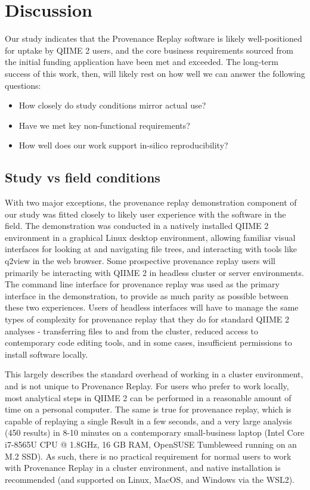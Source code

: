 \chapter{Discussion}

Our study indicates that the Provenance Replay software is likely
well-positioned for uptake by QIIME 2 users, and the core business requirements
sourced from the initial funding application have been met and exceeded. The
long-term success of this work, then, will likely rest on how well we can answer
the following questions:

\begin{itemize}
    \item How closely do study conditions mirror actual use?
    \item Have we met key non-functional requirements?
    \item How well does our work support in-silico reproducibility?
\end{itemize}

\section{Study vs field conditions}

With two major exceptions, the provenance replay demonstration component of our
study was fitted closely to likely user experience with the software in the
field. The demonstration was conducted in a natively installed QIIME 2
environment in a graphical Linux desktop environment, allowing familiar visual
interfaces for looking at and navigating file trees, and interacting with tools
like q2view in the web browser. Some prospective provenance replay users will
primarily be interacting with QIIME 2 in headless cluster or server
environments. The command line interface for provenance replay was used as the
primary interface in the demonstration, to provide as much parity as possible
between these two experiences. Users of headless interfaces will have to manage
the same types of complexity for provenance replay that they do for standard
QIIME 2 analyses - transferring files to and from the cluster, reduced access to
contemporary code editing tools, and in some cases, insufficient permissions to
install software locally. 

This largely describes the standard overhead of working in a cluster
environment, and is not unique to Provenance Replay. For users who prefer to
work locally, most analytical steps in QIIME 2 can be performed in a reasonable
amount of time on a personal computer. The same is true for provenance replay,
which is capable of replaying a single Result in a few seconds, and a very large
analysis (450 results) in 8-10 minutes on a contemporary small-business laptop
(Intel Core i7-8565U CPU @ 1.8GHz, 16 GB RAM, OpenSUSE Tumbleweed running on an
M.2 SSD). As such, there is no practical requirement for normal users to work
with Provenance Replay in a cluster environment, and native installation is
recommended (and supported on Linux, MacOS, and Windows via the WSL2).


